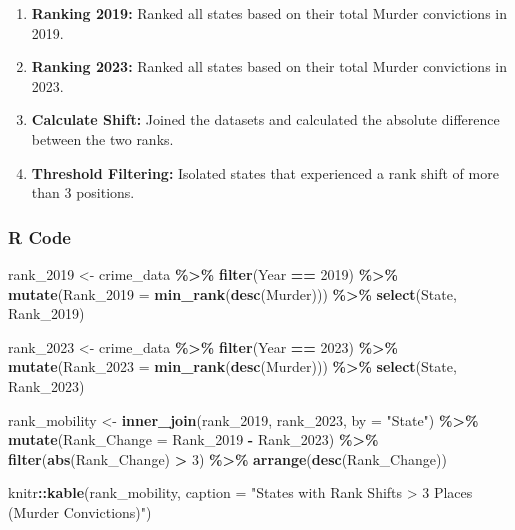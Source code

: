\documentclass[
]{article}
\newenvironment{Shaded}{\begin{snugshade}}{\end{snugshade}}
\newcommand{\AttributeTok}[1]{\textcolor[rgb]{0.13,0.29,0.53}{#1}}
\newcommand{\DecValTok}[1]{\textcolor[rgb]{0.00,0.00,0.81}{#1}}
\newcommand{\FunctionTok}[1]{\textcolor[rgb]{0.13,0.29,0.53}{\textbf{#1}}}
\newcommand{\NormalTok}[1]{#1}
\newcommand{\OtherTok}[1]{\textcolor[rgb]{0.56,0.35,0.01}{#1}}
\newcommand{\SpecialCharTok}[1]{\textcolor[rgb]{0.81,0.36,0.00}{\textbf{#1}}}
\newcommand{\StringTok}[1]{\textcolor[rgb]{0.31,0.60,0.02}{#1}}
\providecommand{\tightlist}{%
  \setlength{\itemsep}{0pt}\setlength{\parskip}{0pt}}
\begin{document}
\begin{enumerate}
\def\labelenumi{\arabic{enumi}.}
\tightlist
\item
  \textbf{Ranking 2019:} Ranked all states based on their total Murder
  convictions in 2019.
\item
  \textbf{Ranking 2023:} Ranked all states based on their total Murder
  convictions in 2023.
\item
  \textbf{Calculate Shift:} Joined the datasets and calculated the
  absolute difference between the two ranks.
\item
  \textbf{Threshold Filtering:} Isolated states that experienced a rank
  shift of more than 3 positions.
\end{enumerate}

\subsubsection{R Code}\label{r-code-1}

\begin{Shaded}
\begin{Highlighting}[]
\NormalTok{rank\_2019 }\OtherTok{\textless{}{-}}\NormalTok{ crime\_data }\SpecialCharTok{\%\textgreater{}\%}
  \FunctionTok{filter}\NormalTok{(Year }\SpecialCharTok{==} \DecValTok{2019}\NormalTok{) }\SpecialCharTok{\%\textgreater{}\%}
  \FunctionTok{mutate}\NormalTok{(}\AttributeTok{Rank\_2019 =} \FunctionTok{min\_rank}\NormalTok{(}\FunctionTok{desc}\NormalTok{(Murder))) }\SpecialCharTok{\%\textgreater{}\%}
  \FunctionTok{select}\NormalTok{(State, Rank\_2019)}

\NormalTok{rank\_2023 }\OtherTok{\textless{}{-}}\NormalTok{ crime\_data }\SpecialCharTok{\%\textgreater{}\%}
  \FunctionTok{filter}\NormalTok{(Year }\SpecialCharTok{==} \DecValTok{2023}\NormalTok{) }\SpecialCharTok{\%\textgreater{}\%}
  \FunctionTok{mutate}\NormalTok{(}\AttributeTok{Rank\_2023 =} \FunctionTok{min\_rank}\NormalTok{(}\FunctionTok{desc}\NormalTok{(Murder))) }\SpecialCharTok{\%\textgreater{}\%}
  \FunctionTok{select}\NormalTok{(State, Rank\_2023)}

\NormalTok{rank\_mobility }\OtherTok{\textless{}{-}} \FunctionTok{inner\_join}\NormalTok{(rank\_2019, rank\_2023, }\AttributeTok{by =} \StringTok{"State"}\NormalTok{) }\SpecialCharTok{\%\textgreater{}\%}
  \FunctionTok{mutate}\NormalTok{(}\AttributeTok{Rank\_Change =}\NormalTok{ Rank\_2019 }\SpecialCharTok{{-}}\NormalTok{ Rank\_2023) }\SpecialCharTok{\%\textgreater{}\%} 
  \FunctionTok{filter}\NormalTok{(}\FunctionTok{abs}\NormalTok{(Rank\_Change) }\SpecialCharTok{\textgreater{}} \DecValTok{3}\NormalTok{) }\SpecialCharTok{\%\textgreater{}\%}
  \FunctionTok{arrange}\NormalTok{(}\FunctionTok{desc}\NormalTok{(Rank\_Change))}

\NormalTok{knitr}\SpecialCharTok{::}\FunctionTok{kable}\NormalTok{(rank\_mobility, }\AttributeTok{caption =} \StringTok{"States with Rank Shifts \textgreater{} 3 Places (Murder Convictions)"}\NormalTok{)}
\end{Highlighting}
\end{Shaded}
\end{document}
